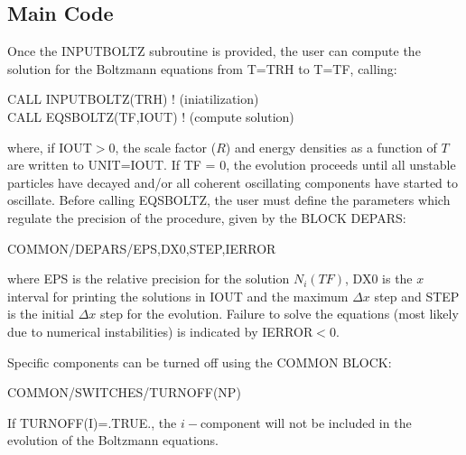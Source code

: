 \documentclass[preprint,notoc]{JHEP3}
\begin{document}
\subsection{Main Code}
\label{sec:Main}


Once the INPUTBOLTZ subroutine is provided, the user can compute the solution for the Boltzmann equations from T=TRH to T=TF,
calling:
\begin{flushleft}
CALL INPUTBOLTZ(TRH)    ! (iniatilization)\\
CALL EQSBOLTZ(TF,IOUT)  ! (compute solution)
\end{flushleft}
where, if IOUT$>0$, the scale factor ($R$) and energy densities as a function of $T$ are written to UNIT=IOUT. If TF = 0,
the evolution proceeds until all unstable particles have decayed and/or all coherent oscillating components have 
started to oscillate. Before calling EQSBOLTZ, the user must define the parameters which regulate the precision
of the procedure, given by the BLOCK DEPARS:
\begin{center}
COMMON/DEPARS/EPS,DX0,STEP,IERROR
\end{center}
where EPS is the relative precision for the solution $N_i(TF)$, DX0 is the $x$ interval for printing the solutions in IOUT and
the maximum $\Delta x$ step and STEP is the initial $\Delta x$ step for the evolution.
Failure to solve the equations (most likely due to numerical instabilities) is indicated by IERROR$<0$.

Specific components can be turned off using the COMMON BLOCK:
\begin{center}
COMMON/SWITCHES/TURNOFF(NP)
\end{center}
If TURNOFF(I)=.TRUE., the $i-$component will not be included in the evolution of the Boltzmann equations.
\end{document}
